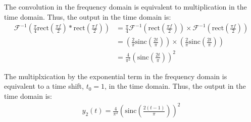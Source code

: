 \documentclass{article}
\begin{document}
\begin{enumerate}[label=2.\arabic*]
    The convolution in the frequency domain is equivalent to multiplication in the time domain. Thus, the output in the time domain is:
    \begin{align*}
        \mathcal{F}^{-1}\left(\frac{\pi}{4}\text{rect}\left(\frac{\pi f}{2}\right) \ast \text{rect}\left(\frac{\pi f}{2}\right)\right) &= \frac{\pi}{4} \mathcal{F}^{-1}\left(\text{rect}\left(\frac{\pi f}{2}\right)\right) \times \mathcal{F}^{-1}\left(\text{rect}\left(\frac{\pi f}{2}\right)\right) \\
        &= \left(\frac{2}{\pi} \text{sinc}\left(\frac{2t}{\pi}\right)\right) \times \left(\frac{2}{\pi} \text{sinc}\left(\frac{2t}{\pi}\right)\right) \\
        &= \frac{4}{\pi^2}\left(\text{sinc}\left(\frac{2t}{\pi}\right)\right)^2 \
    \end{align*}

    The multiplxication by the exponential term in the frequency domain is equivalent to a time shift, $t_0 = 1$,  in the time domain. Thus, the output in the time domain is:
    \begin{align*}
        y_2(t) = \boxed{\frac{4}{\pi^2}\left(\text{sinc}\left(\frac{2(t-1)}{\pi}\right)\right)^2}
    \end{align*}

\end{enumerate}
\end{document}
